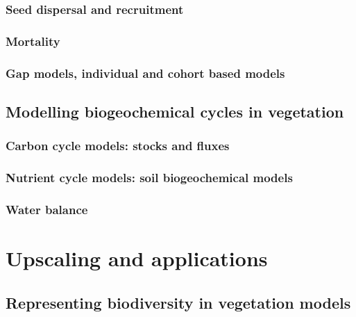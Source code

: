 \documentclass[]{book}
\begin{document}

\section{Seed dispersal and
recruitment}\label{seed-dispersal-and-recruitment}

\section{Mortality}\label{mortality}

\section{Gap models, individual and cohort based
models}\label{gap-models-individual-and-cohort-based-models}

\chapter{Modelling biogeochemical cycles in
vegetation}\label{modelling-biogeochemical-cycles-in-vegetation}


\section{Carbon cycle models: stocks and
fluxes}\label{carbon-cycle-models-stocks-and-fluxes}

\section{Nutrient cycle models: soil biogeochemical
models}\label{nutrient-cycle-models-soil-biogeochemical-models}

\section{Water balance}\label{water-balance}

\part{Upscaling and
applications}\label{part-upscaling-and-applications}

\chapter{Representing biodiversity in vegetation
models}\label{representing-biodiversity-in-vegetation-models}
\end{document}
